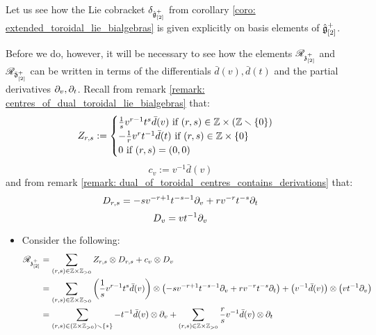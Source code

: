             \begin{remark} \label{remark: extended_toroidal_lie_bialgebras_explicit_formulae}
                Let us see how the Lie cobracket $\delta_{\hat{\mathfrak{g}}_{[2]}^+}$ from corollary \ref{coro: extended_toroidal_lie_bialgebras} is given explicitly on basis elements of $\hat{\mathfrak{g}}_{[2]}^+$.

                Before we do, however, it will be necessary to see how the elements $\scrR_{\z_{[2]}^+}$ and $\scrR_{\bar{\d}_{[2]}^+}$ can be written in terms of the differentials $\bar{d}(v), \bar{d}(t)$ and the partial derivatives $\del_v, \del_t$. Recall from remark \ref{remark: centres_of_dual_toroidal_lie_bialgebras} that:
                    $$
                        Z_{r, s} :=
                        \begin{cases}
                            \text{$\frac1s v^{r - 1} t^s \bar{d}(v)$ if $(r, s) \in \Z \x (\Z \setminus \{0\})$}
                            \\
                            \text{$-\frac1r v^r t^{-1} \bar{d}(t)$ if $(r, s) \in \Z \x \{0\}$}
                            \\
                            \text{$0$ if $(r, s) = (0, 0)$}
                        \end{cases}
                    $$
                    $$c_v := v^{-1} \bar{d}(v)$$
                and from remark \ref{remark: dual_of_toroidal_centres_contains_derivations} that:
                    $$D_{r, s} = -s v^{-r + 1} t^{-s - 1} \del_v + r v^{-r} t^{-s} \del_t$$
                    $$D_v = v t^{-1} \del_v$$
                \begin{itemize}
                    \item Consider the following:
                        $$
                            \begin{aligned}
                                \scrR_{\z_{[2]}^+} & = \sum_{(r, s) \in \Z \x \Z_{> 0}} Z_{r, s} \tensor D_{r, s} + c_v \tensor D_v
                                \\
                                & = \sum_{(r, s) \in \Z \x \Z_{> 0}} \left(\frac1s v^{r - 1} t^s \bar{d}(v)\right) \tensor \left(-s v^{-r + 1} t^{-s - 1} \del_v + r v^{-r} t^{-s} \del_t\right) + \left(v^{-1} \bar{d}(v)\right) \tensor \left(v t^{-1} \del_v\right)
                                \\
                                & = \sum_{(r, s) \in (\Z \x \Z_{> 0}) \setminus \{*\}} -t^{-1} \bar{d}(v) \tensor \del_v + \sum_{(r, s) \in \Z \x \Z_{> 0}} \frac{r}{s} v^{-1} \bar{d}(v) \tensor \del_t

\end{aligned}$$
\end{itemize}
\end{remark}
